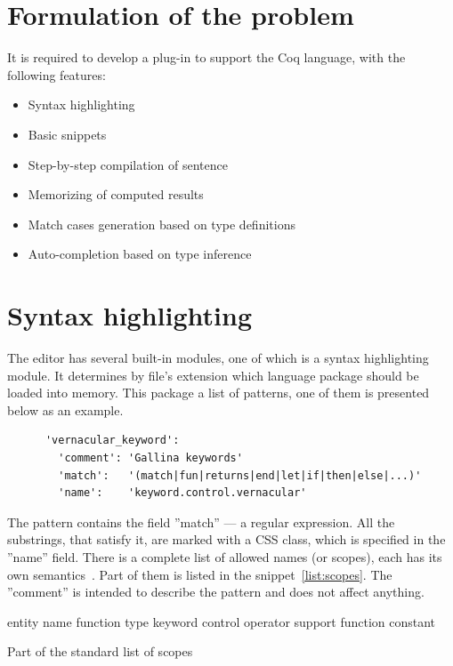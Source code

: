 \section*{Formulation of the problem}

It is required to develop a plug-in to support the Coq language, with the following features:

\begin{itemize}
   \item Syntax highlighting
   \item Basic snippets
   \item Step-by-step compilation of sentence
   \item Memorizing of computed results
   \item Match cases generation based on type definitions
   \item Auto-completion based on type inference
\end{itemize}

\section{Syntax highlighting}

The editor has several built-in modules, one of which is a syntax highlighting module. It determines by file's extension which language package should be loaded into memory. This package  a list of patterns, one of them is presented below as an example.\\

\begin{lstlisting}
      'vernacular_keyword':
        'comment': 'Gallina keywords'
        'match':   '(match|fun|returns|end|let|if|then|else|...)'
        'name':    'keyword.control.vernacular'
\end{lstlisting}

\hspace{1em}

The pattern contains the field ''match'' --- a regular expression. All the substrings, that satisfy it, are marked with a CSS class, which is specified in the ''name'' field. There is a complete list of allowed names (or scopes), each has its own semantics~\autocite{texmate-names}. Part of them is listed in the snippet~\ref{list:scopes}. The ''comment'' is intended to describe the pattern and does not affect anything.

\begin{ListingEnv}[t]
\begin{Verb}

entity
    name
        function
        type
keyword
    control
    operator
support
    function
    constant
\end{Verb}
\caption{Part of the standard list of scopes}
\label{list:scopes}
\end{ListingEnv}

